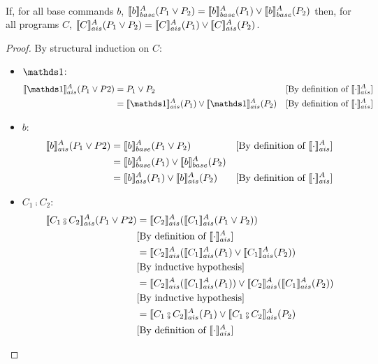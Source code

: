 \documentclass[
  10pt,       %
  twoside,    %
  a4paper,    %
  english,    %
  tikz,       %
  openright,  %
]{book}
\begin{document}
\begin{theorem} $\;$\\
  \label{thm:additivity}
  If, for all base commands $b$, $\llbracket b \rrbracket_{base}^A(P_1 \lor P_2) = \llbracket b \rrbracket_{base}^A(P_1) \lor \llbracket b \rrbracket_{base}^A(P_2)$ then, for
  all programs $C$, 
  $\llbracket C \rrbracket_{ais}^{A}(P_1 \lor P_2) = \llbracket C \rrbracket_{ais}^{A}(P_1) \lor \llbracket C \rrbracket_{ais}^{A}(P_2)$.
\end{theorem}
\begin{proof}
  By structural induction on $C$:
  \begin{itemize}
    \item $\sskip$:
      \begin{align*}
        \asem{\sskip}(P_1 \join P2)
          &= P_1 \join P_2 
          &\text{[By definition of $\asem{\cdot}$]} \\
          &= \asem{\sskip}(P_1) \join \asem{\sskip}(P_2)
          &\text{[By definition of $\asem{\cdot}$]} \\
      \end{align*}
    \item $b$:
      \begin{align*}
        \llbracket b \rrbracket_{ais}^{A}(P_1 \lor P2)
          &= \llbracket b \rrbracket_{base}^A(P_1 \lor P_2)
          &\text{[By definition of $\llbracket \cdot \rrbracket_{ais}^{A}$]} \\
          &= \llbracket b \rrbracket_{base}^A(P_1) \lor \llbracket b \rrbracket_{base}^A(P_2) \\
          &= \llbracket b \rrbracket_{ais}^{A}(P_1) \lor \llbracket b \rrbracket_{ais}^{A}(P_2)
          &\text{[By definition of $\llbracket \cdot \rrbracket_{ais}^{A}$]} \\
      \end{align*}
    \item $C_1 \fcmp C_2$:
      \begin{align*}
        \asem{C_1 \fcmp C_2}(P_1 \join P2)
          &= \asem{C_2}(\asem{C_1}(P_1 \join P_2)) \\
          &\text{[By definition of $\asem{\cdot}$]} \\
          &= \asem{C_2}(\asem{C_1}(P_1) \join \asem{C_1}(P_2)) \\
          &\text{[By inductive hypothesis]} \\
          &= \asem{C_2}(\asem{C_1}(P_1)) \join \asem{C_2}(\asem{C_1}(P_2)) \\
          &\text{[By inductive hypothesis]} \\
          &= \asem{C_1 \fcmp C_2}(P_1) \join \asem{C_1 \fcmp C_2}(P_2) \\
          &\text{[By definition of $\asem{\cdot}$]} \\

\end{align*}
\end{itemize}
\end{proof}
\end{document}
